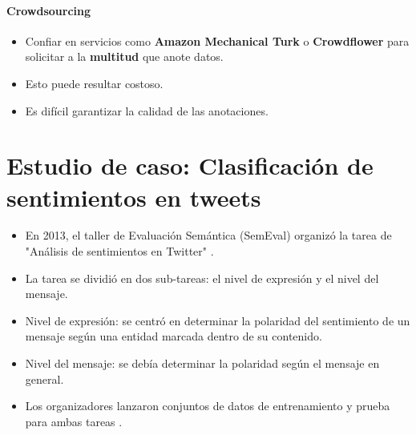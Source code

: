 \paragraph{Crowdsourcing}
\begin{itemize}
   \item Confiar en servicios como \textbf{Amazon Mechanical Turk} o \textbf{Crowdflower} para solicitar a la \textbf{multitud} que anote datos.
   \item Esto puede resultar costoso.
   \item Es difícil garantizar la calidad de las anotaciones.
\end{itemize}

\section{Estudio de caso: Clasificación de sentimientos en tweets}

\begin{itemize}
   \item En 2013, el taller de Evaluación Semántica (SemEval) organizó la tarea de "Análisis de sentimientos en Twitter" \cite{Semeval2013}.
   \item La tarea se dividió en dos sub-tareas: el nivel de expresión y el nivel del mensaje.
   \item Nivel de expresión: se centró en determinar la polaridad del sentimiento de un mensaje según una entidad marcada dentro de su contenido.
   \item Nivel del mensaje: se debía determinar la polaridad según el mensaje en general.
   \item Los organizadores lanzaron conjuntos de datos de entrenamiento y prueba para ambas tareas \cite{Semeval2013}.
\end{itemize}

